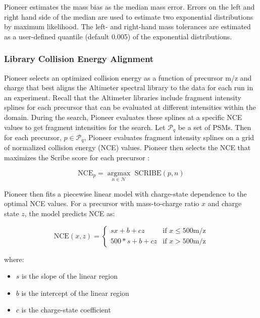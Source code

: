 \documentclass[pdflatex,sn-nature]{sn-jnl}
\begin{document}
Pioneer estimates the mass bias as the median mass error. Errors on the left and right hand side of the median are used to estimate two exponential distributions by maximum likelihood. The left- and right-hand mass tolerances are estimated as a user-defined quantile (default 0.005) of the exponential distributions. 


\subsubsection{Library Collision Energy Alignment}

Pioneer selects an optimized collision energy as a function of precursor m/z and charge that best aligns the Altimeter spectral library to the data for each run in an experiment. Recall that the Altimeter libraries include fragment intensity splines for each precursor that can be evaluated at different intensities within the domain. During the search, Pioneer evaluates these splines at a specific NCE values to get fragment intensities for the search. Let $\mathcal{P}_q$ be a set of PSMs. Then for each precursor, $p \in \mathcal{P}_q$, Pioneer evaluates fragment intensity splines on a grid of normalized collision energy (NCE) values. Pioneer then selects the NCE that maximizes the Scribe score for each precursor \cite{Searle2023-po}:

\begin{equation}
    \text{NCE}_p = \underset{n \in \mathcal{N}}{\operatorname{argmax}} \text{ SCRIBE}(p, n)
\end{equation}

Pioneer then fits a piecewise linear model with charge-state dependence to the optimal NCE values. For a precursor with mass-to-charge ratio $x$ and charge state $z$, the model predicts NCE as:

\begin{equation}
    \text{NCE}(x,z) = \begin{cases}
        sx + b + cz & \text{if } x \leq 500 \text{m/z}\\
        500*s + b + cz & \text{if } x > 500 \text{m/z}
    \end{cases}
\end{equation}

where:
\begin{itemize}
    \item $s$ is the slope of the linear region
    \item $b$ is the intercept of the linear region
    \item $c$ is the charge-state coefficient
\end{itemize}
\end{document}
